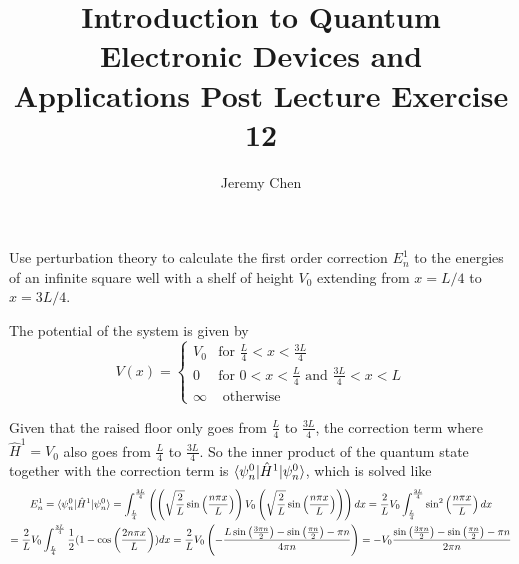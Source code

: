 \documentclass[10pt,letterpaper]{article}
\title{Introduction to Quantum Electronic Devices and Applications Post Lecture Exercise 12}
\author{Jeremy Chen}
\begin{document}
	\maketitle

Use perturbation theory to calculate the first order correction $E_{n}^{1}$ to the energies of an infinite square well with a shelf of height $V_{0}$ extending from $x = L/4$ to $x = 3L/4$.

The potential of the system is given by
$$V(x) = \begin{cases}
V_{0} & \text{for } \frac{L}{4} < x < \frac{3L}{4} \\
0 & \text{for } 0 < x < \frac{L}{4} \text{ and } \frac{3L}{4} < x < L \\
\infty & \text{  otherwise} 
\end{cases}$$

\color{violet}
Given that the raised floor only goes from $\frac{L}{4}$ to $\frac{3L}{4}$, the correction term where $\hat{H}^{1} = V_{0}$ also goes from $\frac{L}{4}$ to $\frac{3L}{4}$. So the inner product of the quantum state together with the correction term is $\braket{\psi_{n}^{0} | \hat{H}^{1} | \psi_{n}^{0}}$, which is solved like
\begin{gather*}
E_{n}^{1} = \braket{\psi_{n}^{0} | \hat{H}^{1} | \psi_{n}^{0}} = \int_{\frac{L}{4}}^{\frac{3L}{4}} \left( \left(  \sqrt{\frac{2}{L}}\sin\left( \frac{n\pi x}{L} \right) \right) V_{0} \left( \sqrt{\frac{2}{L}}\sin\left( \frac{n\pi x}{L} \right) \right) \right) dx = \frac{2}{L}V_{0} \int_{\frac{L}{4}}^{\frac{3L}{4}} \sin^{2}\left( \frac{n\pi x}{L} \right)dx \\
= \frac{2}{L}V_{0} \int_{\frac{L}{4}}^{\frac{3L}{4}} \frac{1}{2} (1 - \cos\left( \frac{2n\pi x}{L} \right)) dx = \frac{2}{L} V_{0} \left(- \frac{L\sin\left( \frac{3\pi n}{2} \right) - \sin\left( \frac{\pi n}{2} \right) - \pi n}{4\pi n}\right) = -V_{0} \frac{\sin\left( \frac{3\pi n}{2} \right) - \sin\left( \frac{\pi n}{2} \right) - \pi n}{2\pi n}
\end{gather*}
\color{black}
\end{document}
